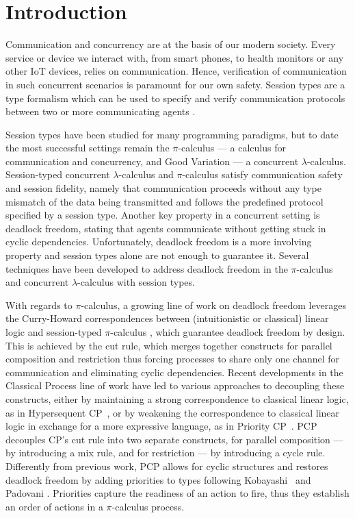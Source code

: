 \documentclass[main.tex]{subfiles}
\begin{document}
\section{Introduction}
Communication and concurrency are at the basis of our modern society. Every service or device we interact with, from smart phones, to health monitors or any other IoT devices, relies on communication. Hence, verification of communication in such concurrent scenarios is paramount for our own safety. Session types are a type formalism which can be used to specify and verify communication protocols between two or more communicating agents \cite{honda93,takeuchihonda94,hondavasconcelos98,carbonehonda07}.

Session types have been studied for many programming paradigms, but to date the most successful settings remain the $\pi$-calculus \cite{sangiorgiwalker01} ---  a calculus for communication and concurrency, and Good Variation \cite[GV]{wadler15,lindleymorris15} ---  a concurrent $\lambda$-calculus.
Session-typed concurrent $\lambda$-calculus and $\pi$-calculus satisfy communication safety and session fidelity, namely that communication proceeds without any type mismatch of the data being transmitted and follows the predefined protocol specified by a session type.
Another key property in a concurrent setting is deadlock freedom, stating that agents communicate without getting stuck in cyclic dependencies. Unfortunately, deadlock freedom is a more involving property and session types alone are not enough to guarantee it. Several techniques have been developed to address deadlock freedom in the $\pi$-calculus and concurrent $\lambda$-calculus with session types.

With regards to $\pi$-calculus, a growing line of work on deadlock freedom leverages the Curry-Howard correspondences between (intuitionistic or classical) linear logic and session-typed $\pi$-calculus \cite{cairespfenning10,wadler12}, which guarantee deadlock freedom by design. This is achieved by the cut rule, which merges together constructs for parallel composition and restriction thus forcing processes to share only one channel for communication and eliminating cyclic dependencies. Recent developments in the Classical Process \cite[CP]{wadler12} line of work have led to various approaches to decoupling these constructs, either by maintaining a strong correspondence to classical linear logic, as in Hypersequent CP~\cite[HCP]{kokkemontesi19popl,kokkemontesi19tlla}, or by weakening the correspondence to classical linear logic in exchange for a more expressive language, as in Priority CP~\cite[PCP]{dardhagay18}. PCP decouples CP's cut rule into two separate constructs, for parallel composition --- by  introducing a mix rule, and for restriction --- by introducing a cycle rule. Differently from previous work, PCP allows for cyclic structures and restores deadlock freedom by adding priorities to types following Kobayashi~\cite{kobayashi06} and Padovani \cite{padovani14}. Priorities capture the readiness of an action to fire, thus they establish an order of actions in a $\pi$-calculus process.
\end{document}
